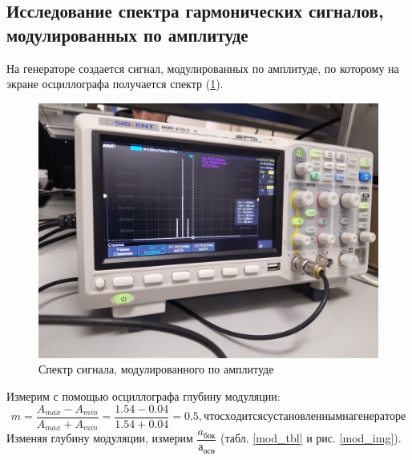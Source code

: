 \documentclass[a4paper,12pt]{article} %
\begin{document}
\subsection{Исследование спектра гармонических сигналов, модулированных по амплитуде}
На генераторе создается сигнал, модулированных по амплитуде, по которому на экране осциллографа получается спектр (\ref{мод}).
\begin{figure}[h!]
\begin{center}
\includegraphics[width=\textwidth]{3}
\caption{Спектр сигнала, модулированного по амплитуде} \label{мод}
\end{center}
\end{figure}
Измерим с помощью осциллографа глубину модуляции:
\begin{equation}
m = \dfrac{A_{max}-A_{min}}{A_{max}+A_{min}} = \dfrac{1.54 - 0.04}{1.54 + 0.04} = 0.5, что сходится с установленным на генераторе
\end{equation}
Изменяя глубину модуляции, измерим $\dfrac{a_{бок}}{а_{осн}}$ (табл. \ref{mod_tbl} и рис. \ref{mod_img}).
\end{document}
